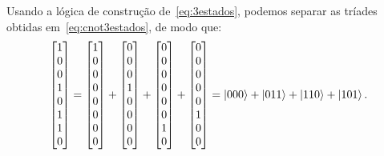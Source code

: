 Usando a lógica de construção de~\eqref{eq:3estados}, podemos separar as tríades obtidas em~\eqref{eq:cnot3estados}, de modo que:
\begin{equation}
	\begin{split}
	\begin{bmatrix}
	1 \\
	0 \\
	0 \\
	1 \\
	0 \\
	1 \\
	1 \\
	0
	\end{bmatrix} = \begin{bmatrix}
	1 \\
	0 \\
	0 \\
	0 \\
	0 \\
	0 \\
	0 \\
	0
	\end{bmatrix} + \begin{bmatrix}
	0 \\
	0 \\
	0 \\
	1 \\
	0 \\
	0 \\
	0 \\
	0
	\end{bmatrix} + \begin{bmatrix}
	0 \\
	0 \\
	0 \\
	0 \\
	0 \\
	0 \\
	1 \\
	0
	\end{bmatrix} + \begin{bmatrix}
	0 \\
	0 \\
	0 \\
	0 \\
	0 \\
	1 \\
	0 \\
	0
	\end{bmatrix} = \ket{000}+\ket{011}+\ket{110}+\ket{101}.
	\end{split}
\end{equation}

